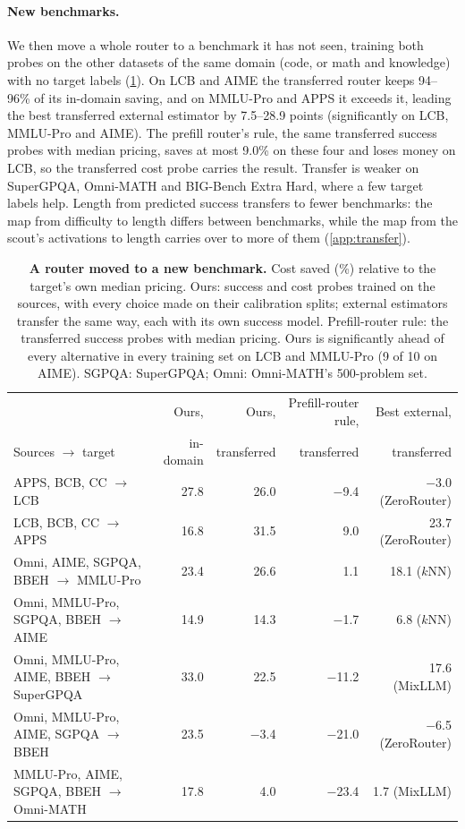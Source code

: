 \documentclass[10pt]{article}
\begin{document}
\paragraph{New benchmarks.}
We then move a whole router to a benchmark it has not seen, training both probes on the other datasets of the same domain (code, or math and knowledge) with no target labels (\cref{tab:transfer}). On LCB and AIME the transferred router keeps 94--96\% of its in-domain saving, and on MMLU-Pro and APPS it exceeds it, leading the best transferred external estimator by 7.5--28.9 points (significantly on LCB, MMLU-Pro and AIME). The prefill router's rule, the same transferred success probes with median pricing, saves at most 9.0\% on these four and loses money on LCB, so the transferred cost probe carries the result. Transfer is weaker on SuperGPQA, Omni-MATH and BIG-Bench Extra Hard, where a few target labels help. Length from predicted success transfers to fewer benchmarks: the map from difficulty to length differs between benchmarks, while the map from the scout's activations to length carries over to more of them (\cref{app:transfer}).

\begin{table}[t]
\centering
\footnotesize
\setlength{\tabcolsep}{4pt}
\begin{tabular}{lrrrr}
\toprule
 & Ours, & Ours, & Prefill-router rule, & Best external, \\
Sources $\to$ target & in-domain & transferred & transferred & transferred \\
\midrule
APPS, BCB, CC $\to$ LCB & 27.8 & 26.0 & $-$9.4 & $-$3.0 (ZeroRouter) \\
LCB, BCB, CC $\to$ APPS & 16.8 & 31.5 & 9.0 & 23.7 (ZeroRouter) \\
Omni, AIME, SGPQA, BBEH $\to$ MMLU-Pro & 23.4 & 26.6 & 1.1 & 18.1 ($k$NN) \\
Omni, MMLU-Pro, SGPQA, BBEH $\to$ AIME & 14.9 & 14.3 & $-$1.7 & 6.8 ($k$NN) \\
Omni, MMLU-Pro, AIME, BBEH $\to$ SuperGPQA & 33.0 & 22.5 & $-$11.2 & 17.6 (MixLLM) \\
Omni, MMLU-Pro, AIME, SGPQA $\to$ BBEH & 23.5 & $-$3.4 & $-$21.0 & $-$6.5 (ZeroRouter) \\
MMLU-Pro, AIME, SGPQA, BBEH $\to$ Omni-MATH & 17.8 & 4.0 & $-$23.4 & 1.7 (MixLLM) \\
\bottomrule
\end{tabular}
\caption{\textbf{A router moved to a new benchmark.} Cost saved (\%) relative to the target's own median pricing. Ours: success and cost probes trained on the sources, with every choice made on their calibration splits; external estimators transfer the same way, each with its own success model. Prefill-router rule: the transferred success probes with median pricing. Ours is significantly ahead of every alternative in every training set on LCB and MMLU-Pro (9 of 10 on AIME). SGPQA: SuperGPQA; Omni: Omni-MATH's 500-problem set.}
\label{tab:transfer}
\end{table}
\end{document}
